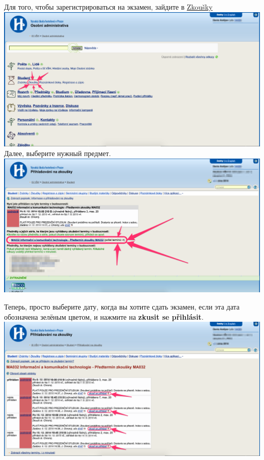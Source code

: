 \documentclass[a4paper,12pt]{article}
\begin{document}
Для того, чтобы зарегистрироваться на экзамен, зайдите в 
\href{https://is.vsh.cz/auth/student/prihl_na_zkousky.pl}{Zkoušky} \\ 

\includegraphics[width=\textwidth]{s-exam-01.png} \\

Далее, выберите нужный предмет. \\

\includegraphics[width=\textwidth]{s-exam-02.png} \\

\newpage

Теперь, просто выберите дату, когда вы хотите сдать экзамен, если эта дата обозначена
зелёным цветом, и нажмите на \textbf{zkusit se přihlásit}. \\

\includegraphics[width=\textwidth]{s-exam-03.png} \\
\end{document}
